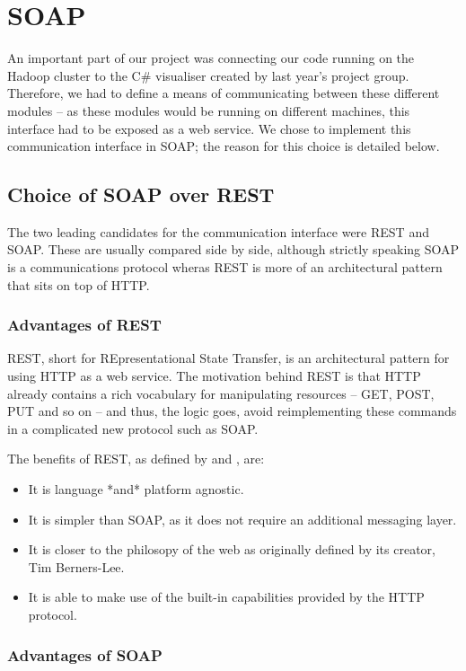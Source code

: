 \section{SOAP}

An important part of our project was connecting our code running on the Hadoop cluster to the C\# visualiser created by last year's project group. Therefore, we had to define a means of communicating between these different modules -- as these modules would be running on different machines, this interface had to be exposed as a web service. We chose to implement this communication interface in SOAP; the reason for this choice is detailed below.

\subsection{Choice of SOAP over REST}

The two leading candidates for the communication interface were REST and SOAP. These are usually compared side by side, although strictly speaking SOAP is a communications protocol wheras REST is more of an architectural pattern that sits on top of HTTP. \cite{infoq}

\subsubsection{Advantages of REST}

REST, short for REpresentational State Transfer, is an architectural pattern for using HTTP as a web service. The motivation behind REST is that HTTP already contains a rich vocabulary for manipulating resources -- GET, POST, PUT and so on -- and thus, the logic goes, avoid reimplementing these commands in a complicated new protocol such as SOAP.

The benefits of REST, as defined by \cite{ajoxonomy} and \cite{infoq}, are:
\begin{itemize}
\item It is language *and* platform agnostic.
\item It is simpler than SOAP, as it does not require an additional messaging
layer.
\item It is closer to the philosopy of the web as originally defined by its
creator, Tim Berners-Lee.
\item It is able to make use of the built-in capabilities provided by the HTTP
protocol.
\end{itemize}

\subsubsection{Advantages of SOAP}

